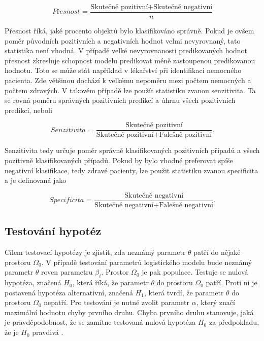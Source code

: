 \begin{equation}
    \textit{Přesnost = } \frac{\text{Skutečně pozitivní} + \text{Skutečně negativní}}{n}
\end{equation}


Přesnost říká, jaké procento objektů bylo klasifikováno správně. Pokud je ovšem poměr původních pozitivních a negativních hodnot velmi nevyrovnaný,
tato statistika není vhodná. V případě velké nevyrovnanosti predikovaných hodnot přesnost zkresluje schopnost modelu predikovat méně zastoupenou predikovanou hodnotu. 
Toto se může stát například v lékařství při identifikaci nemocného pacienta. Zde většinou dochází k velkému nepoměru mezi počtem nemocných a počtem zdravých.
V takovém případě lze použít statistiku zvanou senzitivita. Ta se rovná poměru správných pozitivních predikcí a úhrnu všech pozitivních predikcí, neboli

\begin{equation}
    \textit{Senzitivita = } \frac{\text{Skutečně pozitivní}}{\text{Skutečně pozitivní} + \text{Falešně pozitivní}}.
\end{equation}

Senzitivita tedy určuje poměr správně klasifikovaných pozitivních případů a všech pozitivně klasifikovaných případů. Pokud by bylo vhodné preferovat
spíše negativní klasifikace, tedy zdravé pacienty, lze použit statistiku zvanou specificita a je definovaná jako

\begin{equation}
    \textit{Specificita = } \frac{\text{Skutečně negativní}}{\text{Skutečně negativní} + \text{Falešně negativní}}.
\end{equation}

\subsection{Testování hypotéz}
Cílem testovací hypotézy je zjistit, zda neznámý parametr $\theta$ patří do nějaké prostoru $\Omega_0$. V případě testování parametrů logistického modelu bude
neznámý parametr $\theta$ roven parametru $\beta_i$. Prostor $\Omega_0$ je pak populace. Testuje se nulová hypotéza, značená $H_0$, která říká, že
parametr $\theta$ do prostoru $\Omega_0$ patří. Proti ní je postavená hypotéza alternativní, značená $H_1$, která tvrdí, že parametr $\theta$ do prostoru
$\Omega_0$ nepatří. Pro testování je nutné zvolit parametr $\alpha$, který značí maximální hodnotu chyby prvního druhu. Chyba prvního druhu stanovuje, jaká je 
pravděpodobnost, že se zamítne testovaná nulová hypotéza $H_0$ za předpokladu, že je $H_0$ pravdivá \cite{hardle_applied_2015}.

